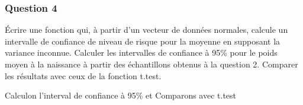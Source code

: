 \documentclass[
]{article}
\newenvironment{Shaded}{\begin{snugshade}}{\end{snugshade}}
\newcommand{\ControlFlowTok}[1]{\textcolor[rgb]{0.13,0.29,0.53}{\textbf{#1}}}
\newcommand{\DecValTok}[1]{\textcolor[rgb]{0.00,0.00,0.81}{#1}}
\newcommand{\FunctionTok}[1]{\textcolor[rgb]{0.00,0.00,0.00}{#1}}
\newcommand{\NormalTok}[1]{#1}
\newcommand{\OtherTok}[1]{\textcolor[rgb]{0.56,0.35,0.01}{#1}}
\newcommand{\SpecialCharTok}[1]{\textcolor[rgb]{0.00,0.00,0.00}{#1}}
\begin{document}
\hypertarget{question-4}{%
\subsubsection{Question 4}\label{question-4}}

Écrire une fonction qui, à partir d'un vecteur de données normales,
calcule un intervalle de confiance de niveau de risque pour la moyenne
en supposant la variance inconnue. Calculer les intervalles de confiance
à 95\% pour le poids moyen à la naissance à partir des échantillons
obtenus à la question 2. Comparer les résultats avec ceux de la fonction
t.test.

\begin{Shaded}
\end{Shaded}

Calculon l'interval de confiance à 95\% et Comparons avec t.test
\end{document}
